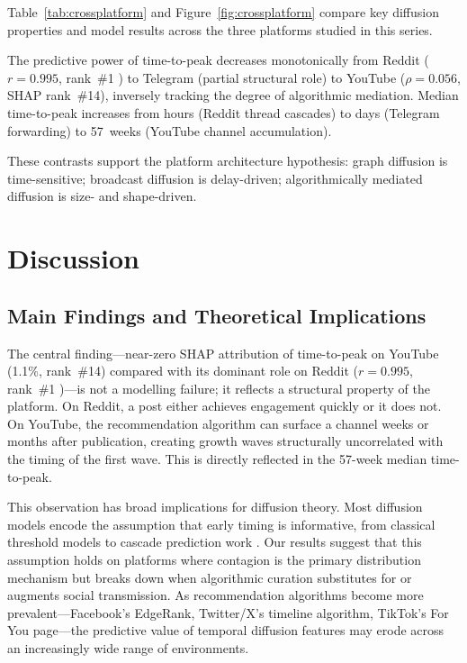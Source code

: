 \documentclass[journal,article,submit,pdftex,moreauthors]{Definitions/mdpi}
\begin{document}
Table~\ref{tab:crossplatform} and Figure~\ref{fig:crossplatform}
compare key diffusion properties and model results across the three
platforms studied in this series.

The predictive power of time-to-peak decreases monotonically from
Reddit ($r = 0.995$, rank~\#1 \cite{ref-paper1}) to Telegram
(partial structural role) to YouTube ($\rho = 0.056$, SHAP rank~\#14),
inversely tracking the degree of algorithmic mediation.
Median time-to-peak increases from hours (Reddit thread cascades) to
days (Telegram forwarding) to 57~weeks (YouTube channel accumulation).

These contrasts support the platform architecture hypothesis:
graph diffusion is time-sensitive; broadcast diffusion is delay-driven;
algorithmically mediated diffusion is size- and shape-driven.

\section{Discussion}
\label{sec:discussion}

\subsection{Main Findings and Theoretical Implications}

The central finding---near-zero SHAP attribution of time-to-peak on
YouTube (1.1\%, rank~\#14) compared with its dominant role on Reddit
($r = 0.995$, rank~\#1 \cite{ref-paper1})---is not a modelling failure;
it reflects a structural property of the platform.
On Reddit, a post either achieves engagement quickly or it does not.
On YouTube, the recommendation algorithm can surface a channel weeks or
months after publication, creating growth waves structurally uncorrelated
with the timing of the first wave.
This is directly reflected in the 57-week median time-to-peak.

This observation has broad implications for diffusion theory.
Most diffusion models encode the assumption that early timing is
informative, from classical threshold models \cite{ref-kermack1927}
to cascade prediction work \cite{ref-goel2016,ref-cheng2014}.
Our results suggest that this assumption holds on platforms where
contagion is the primary distribution mechanism but breaks down when
algorithmic curation substitutes for or augments social transmission.
As recommendation algorithms become more prevalent---Facebook's EdgeRank,
Twitter/X's timeline algorithm, TikTok's For You page---the predictive
value of temporal diffusion features may erode across an increasingly
wide range of environments.
\end{document}
